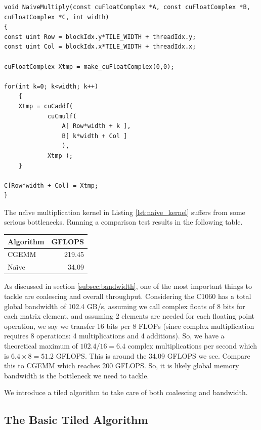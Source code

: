 \documentclass[a4paper,12pt]{report}
\def\gflops{{GFLOPS}}
\newenvironment{CUDAtiming}%
{\setlength{\extrarowheight}{1.5pt} \begin{center}\begin{tabular}{l|r} Algorithm & GFLOPS\\\hline}%
{\end{tabular}\end{center}}
\begin{document}
\begin{lstlisting}[float,caption=Na\"{\i}ve Matrix Multiplication Kernel, label=lst:naive_kernel]
void NaiveMultiply(const cuFloatComplex *A, const cuFloatComplex *B, cuFloatComplex *C, int width)
{
const uint Row = blockIdx.y*TILE_WIDTH + threadIdx.y;
const uint Col = blockIdx.x*TILE_WIDTH + threadIdx.x;

cuFloatComplex Xtmp = make_cuFloatComplex(0,0);

for(int k=0; k<width; k++)
	{
	Xtmp = cuCaddf(
			cuCmulf(
				A[ Row*width + k ],
				B[ k*width + Col ]
				),
			Xtmp ); 
	}

C[Row*width + Col] = Xtmp;
}
\end{lstlisting}

The na{\"\i}ve multiplication kernel in Listing \ref{lst:naive_kernel} suffers from some serious bottlenecks.
Running a comparison test results in the following table.

\begin{CUDAtiming}
CGEMM & 219.45\\
Na{\"\i}ve & 34.09
\end{CUDAtiming}

As discussed in section \ref{subsec:bandwidth}, one of the most important things to tackle are coalescing and overall throughput.
Considering the C1060 has a total global bandwidth of 102.4 GB/s, assuming we call complex floats of 8 bits for each matrix element, and assuming 2 elements are needed for each floating point operation, we say we transfer 16 bits per 8 FLOPs (since complex multiplication requires 8 operations: 4 multiplications and 4 additions).
So, we have a theoretical maximum of $102.4/16 = 6.4$ complex multiplications per second which is $6.4 \times 8 = 51.2$ \gflops{}.
This is around the 34.09 \gflops{} we see.
Compare this to CGEMM which reaches 200 \gflops{}.
So, it is likely global memory bandwidth is the bottleneck we need to tackle.

We introduce a tiled algorithm to take care of both coalescing and bandwidth.


\subsection{The Basic Tiled Algorithm}
\end{document}
